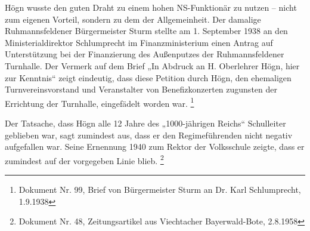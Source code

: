 \begin{figure}
\img{}
\caption{}
\end{figure}

Högn wusste den guten Draht zu einem hohen NS-Funktionär zu nutzen –
nicht zum eigenen Vorteil, sondern zu dem der Allgemeinheit. Der
damalige Ruhmannsfeldener Bürgermeister Sturm stellte am 1. September
1938 an den Ministerialdirektor Schlumprecht im Finanzministerium einen
Antrag auf Unterstützung bei der Finanzierung des Außenputzes der
Ruhmannsfeldener Turnhalle. Der Vermerk auf dem Brief „In Abdruck an H.
Oberlehrer Högn, hier zur Kenntnis“ zeigt eindeutig, dass diese
Petition durch Högn, den ehemaligen Turnvereinsvorstand und
Veranstalter von Benefizkonzerten zugunsten der Errichtung der
Turnhalle, eingefädelt worden war. \footnote{Dokument Nr. 99, Brief von
Bürgermeister Sturm an Dr. Karl Schlumprecht, 1.9.1938}

Der Tatsache, dass Högn alle 12 Jahre des „1000-jährigen Reichs“
Schulleiter geblieben war, sagt zumindest aus, dass er den
Regimeführenden nicht negativ aufgefallen war. Seine Ernennung 1940 zum
Rektor der Volksschule zeigte, dass er zumindest auf der vorgegeben
Linie blieb. \footnote{Dokument Nr. 48, Zeitungsartikel aus Viechtacher
Bayerwald-Bote, 2.8.1958}

